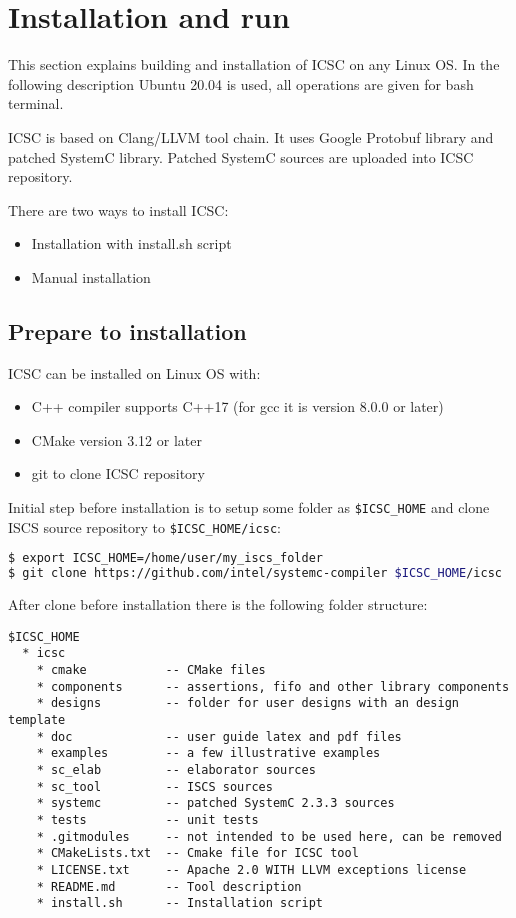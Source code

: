 \section{Installation and run}\label{section:install}

This section explains building and installation of ICSC on any Linux OS. In the following description Ubuntu 20.04 is used, all operations are given for bash terminal.

ICSC is based on Clang/LLVM tool chain. It uses Google Protobuf library and patched SystemC library. Patched SystemC sources are uploaded into ICSC repository.   

There are two ways to install ICSC: 
\begin{itemize}
\item Installation with install.sh script
\item Manual installation
\end{itemize}

\subsection{Prepare to installation}

ICSC can be installed on Linux OS with:
%
\begin{itemize}
\item C++ compiler supports C++17 (for gcc it is version 8.0.0 or later)
\item CMake version 3.12 or later
\item git to clone ICSC repository
\end{itemize} 
%

Initial step before installation is to setup some folder as {\tt\$ICSC\_HOME} and clone ISCS source repository to {\tt\$ICSC\_HOME/icsc}:
%
\begin{lstlisting}[language=bash]
$ export ICSC_HOME=/home/user/my_iscs_folder
$ git clone https://github.com/intel/systemc-compiler $ICSC_HOME/icsc
\end{lstlisting}

After clone before installation there is the following folder structure:
%
\begin{lstlisting}
$ICSC_HOME
  * icsc
    * cmake           -- CMake files
    * components      -- assertions, fifo and other library components
    * designs         -- folder for user designs with an design template
    * doc             -- user guide latex and pdf files
    * examples        -- a few illustrative examples
    * sc_elab         -- elaborator sources
    * sc_tool         -- ISCS sources
    * systemc         -- patched SystemC 2.3.3 sources
    * tests           -- unit tests
    * .gitmodules     -- not intended to be used here, can be removed
    * CMakeLists.txt  -- Cmake file for ICSC tool
    * LICENSE.txt     -- Apache 2.0 WITH LLVM exceptions license
    * README.md       -- Tool description
    * install.sh      -- Installation script
\end{lstlisting}

